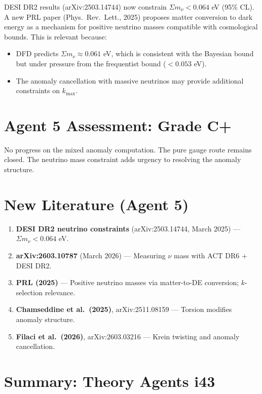 \documentclass[11pt,a4paper]{article}
\begin{document}
DESI DR2 results (arXiv:2503.14744) now constrain $\Sigma m_\nu < 0.064$ eV (95\% CL). A new PRL paper (Phys.\ Rev.\ Lett., 2025) proposes matter conversion to dark energy as a mechanism for positive neutrino masses compatible with cosmological bounds. This is relevant because:
\begin{itemize}
\item DFD predicts $\Sigma m_\nu \approx 0.061$ eV, which is consistent with the Bayesian bound but under pressure from the frequentist bound ($< 0.053$ eV).
\item The anomaly cancellation with massive neutrinos may provide additional constraints on $k_{\max}$.
\end{itemize}

\section{Agent 5 Assessment: Grade C+}

No progress on the mixed anomaly computation. The pure gauge route remains closed. The neutrino mass constraint adds urgency to resolving the anomaly structure.

\section{New Literature (Agent 5)}

\begin{enumerate}
\item \textbf{DESI DR2 neutrino constraints} (arXiv:2503.14744, March 2025) --- $\Sigma m_\nu < 0.064$ eV.
\item \textbf{arXiv:2603.10787} (March 2026) --- Measuring $\nu$ mass with ACT DR6 + DESI DR2.
\item \textbf{PRL (2025)} --- Positive neutrino masses via matter-to-DE conversion; $k$-selection relevance.
\item \textbf{Chamseddine et al.\ (2025)}, arXiv:2511.08159 --- Torsion modifies anomaly structure.
\item \textbf{Filaci et al.\ (2026)}, arXiv:2603.03216 --- Krein twisting and anomaly cancellation.
\end{enumerate}


\section*{Summary: Theory Agents i43}
\end{document}

